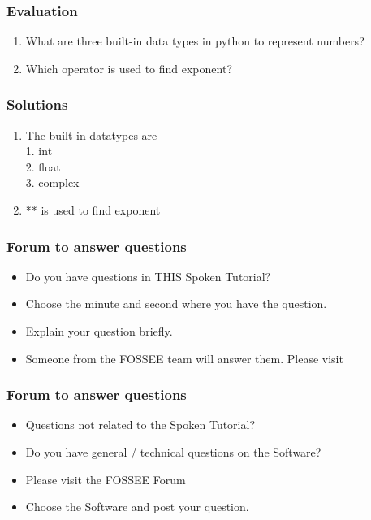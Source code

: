 \documentclass[17pt]{beamer}
\begin{document}
\begin{frame}
\frametitle{Evaluation}
\label{sec-14}


\begin{enumerate}
\item What are three built-in data types in python to represent numbers?
\vspace{12pt}
\item Which operator is used to find exponent?
\end{enumerate}
\end{frame}

\begin{frame}
\frametitle{Solutions}
\label{sec-15}


\begin{enumerate}
\item The built-in datatypes are\\
1. int \\
2. float \\
3. complex \\
\vspace{12pt}
\item ** is used to find exponent
\end{enumerate}
\end{frame}
\begin{frame}
\frametitle{Forum to answer questions}
\begin{itemize}
\item Do you have questions in THIS Spoken Tutorial?
\item Choose the minute and second where you have the question.
\item Explain your question briefly.
\item Someone from the FOSSEE team will answer them. Please visit 
\end{itemize}
\begin{center}
{\color{blue}{http://forums.spoken-tutorial.org/}}
 \end{center} 
\end{frame}
\begin{frame}
\frametitle{Forum to answer questions}
\begin{itemize}
\item Questions not related to the Spoken Tutorial?
\item Do you have general / technical questions on the Software?
\item Please visit the FOSSEE Forum
\begin{center}
{\color{blue}{http://forums.fossee.in/}}
 \end{center}
\item Choose the Software and post your question.
\end{itemize}
\end{frame}
\end{document}
